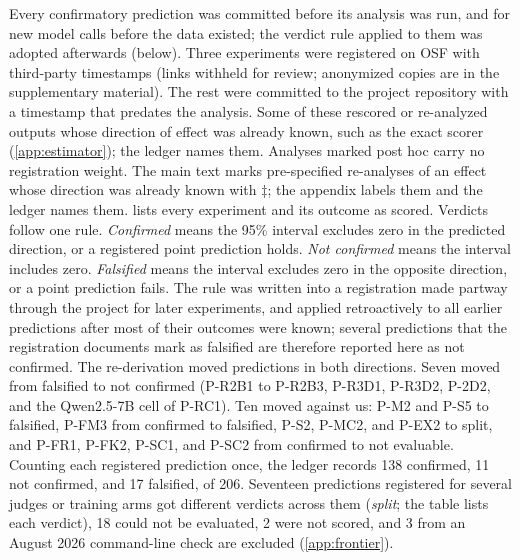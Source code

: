 Every confirmatory prediction was committed before its analysis was run, and for new model calls before the data existed; the verdict rule applied to them was adopted afterwards (below). Three experiments were registered on OSF with third-party timestamps\osf{} (links withheld for review; anonymized copies are in the supplementary material). The rest were committed to the project repository with a timestamp that predates the analysis\pre. Some of these rescored or re-analyzed outputs whose direction of effect was already known, such as the exact scorer (\cref{app:estimator}); the ledger names them. Analyses marked post hoc\ph{} carry no registration weight. The main text marks pre-specified re-analyses of an effect whose direction was already known with $\ddagger$; the appendix labels them \pre{} and the ledger names them.  lists every experiment and its outcome as scored. Verdicts follow one rule. \emph{Confirmed} means the 95\% interval excludes zero in the predicted direction, or a registered point prediction holds. \emph{Not confirmed} means the interval includes zero. \emph{Falsified} means the interval excludes zero in the opposite direction, or a point prediction fails. The rule was written into a registration made partway through the project for later experiments, and applied retroactively to all earlier predictions after most of their outcomes were known; several predictions that the registration documents mark as falsified are therefore reported here as not confirmed. The re-derivation moved predictions in both directions. Seven moved from falsified to not confirmed (P-R2B1 to P-R2B3, P-R3D1, P-R3D2, P-2D2, and the Qwen2.5-7B cell of P-RC1). Ten moved against us: P-M2 and P-S5 to falsified, P-FM3 from confirmed to falsified, P-S2, P-MC2, and P-EX2 to split, and P-FR1, P-FK2, P-SC1, and P-SC2 from confirmed to not evaluable. Counting each registered prediction once, the ledger records 138 confirmed, 11 not confirmed, and 17 falsified, of 206. Seventeen predictions registered for several judges or training arms got different verdicts across them (\emph{split}; the table lists each verdict), 18 could not be evaluated, 2 were not scored, and 3 from an August 2026 command-line check are excluded (\cref{app:frontier}).

